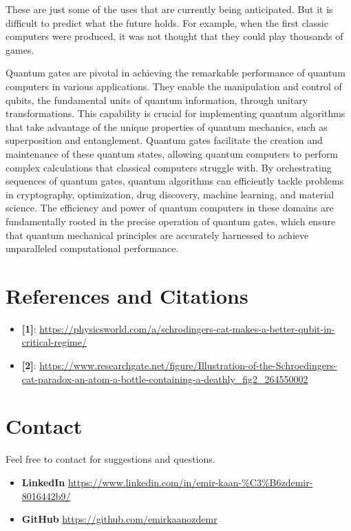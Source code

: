\documentclass{article}
\begin{document}
These are just some of the uses that are currently being anticipated. But it is difficult to predict what the future holds. For example, when the first classic computers were produced, it was not thought that they could play thousands of games.


Quantum gates are pivotal in achieving the remarkable performance of quantum computers in various applications. They enable the manipulation and control of qubits, the fundamental units of quantum information, through unitary transformations. This capability is crucial for implementing quantum algorithms that take advantage of the unique properties of quantum mechanics, such as superposition and entanglement. Quantum gates facilitate the creation and maintenance of these quantum states, allowing quantum computers to perform complex calculations that classical computers struggle with. By orchestrating sequences of quantum gates, quantum algorithms can efficiently tackle problems in cryptography, optimization, drug discovery, machine learning, and material science. The efficiency and power of quantum computers in these domains are fundamentally rooted in the precise operation of quantum gates, which ensure that quantum mechanical principles are accurately harnessed to achieve unparalleled computational performance.
\vspace{15cm}
\section{References and Citations}

\begin{itemize}
    \item \textbf{[1]}: \url{https://physicsworld.com/a/schrodingers-cat-makes-a-better-qubit-in-critical-regime/}
    \item \textbf{[2]}: \url{https://www.researchgate.net/figure/Illustration-of-the-Schroedingers-cat-paradox-an-atom-a-bottle-containing-a-deathly_fig2_264550002}
\end{itemize}
\section{Contact}
Feel free to contact for suggestions and questions.
\begin{itemize}
    \item \textbf{LinkedIn} \url{https://www.linkedin.com/in/emir-kaan-%C3%B6zdemir-8016442b9/}
    \item \textbf{GitHub} \url{https://github.com/emirkaanozdemr} 
\end{itemize}
\end{document}
